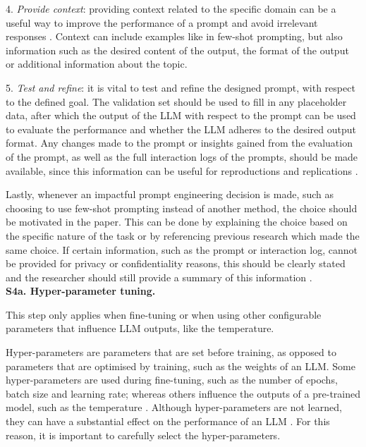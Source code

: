 \documentclass[a4paper]{article}
\newcommand{\infobox}[2]{
	\begin{tcolorbox}[
		skin=widget,
		boxrule=1mm,
		coltitle=black,
		colframe=darkishgray,
		colback=lightergray,
		width=(\linewidth),
		before=\hfill,
		after=\hfill,
		before skip=1pt,
		adjusted title={#1}
		]
		#2
	\end{tcolorbox}
}
\begin{document}
4. \textit{Provide context}: providing context related to the specific domain can be a useful way to improve the performance of a prompt and avoid irrelevant responses \cite{Marvin2024}. Context can include examples like in few-shot prompting, but also information such as the desired content of the output, the format of the output or additional information about the topic. 

5. \textit{Test and refine}: it is vital to test and refine the designed prompt, with respect to the defined goal. The validation set should be used to fill in any placeholder data, after which the output of the LLM with respect to the prompt can be used to evaluate the performance and whether the LLM adheres to the desired output format. Any changes made to the prompt or insights gained from the evaluation of the prompt, as well as the full interaction logs of the prompts, should be made available, since this information can be useful for reproductions and replications \cite{baltes2025guidelinesempiricalstudiessoftware}.

Lastly, whenever an impactful prompt engineering decision is made, such as choosing to use few-shot prompting instead of another method, the choice should be motivated in the paper. This can be done by explaining the choice based on the specific nature of the task or by referencing previous research which made the same choice. If certain information, such as the prompt or interaction log, cannot be provided for privacy or confidentiality reasons, this should be clearly stated and the researcher should still provide a summary of this information \cite{baltes2025guidelinesempiricalstudiessoftware}.\\

\textbf{S4a. Hyper-parameter tuning.}\\
\infobox{Optional}{This step only applies when fine-tuning or when using other configurable parameters that influence LLM outputs, like the temperature.}
Hyper-parameters are parameters that are set before training, as opposed to parameters that are optimised by training, such as the weights of an LLM. Some hyper-parameters are used during fine-tuning, such as the number of epochs, batch size and learning rate; whereas others influence the outputs of a pre-trained model, such as the temperature \cite{halfon2024hyper,peeperkorn2024}. Although hyper-parameters are not learned, they can have a substantial effect on the performance of an LLM \cite{halfon2024hyper}. For this reason, it is important to carefully select the hyper-parameters. 
\end{document}

